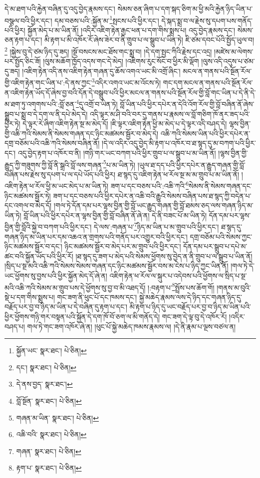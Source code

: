 དེ་མ་ཐག་པའི་རྐྱེན་བཞིན་དུ་འདུ་བྱེད་རྣམས་དང་། སེམས་ཅན་ཞིག་པ་དག་སྐད་ཅིག་མ་ཕྱི་མའི་རྐྱེན་ཉིད་ཡིན་པ་བསྩལ་བའི་ཕྱིར་དང་། དམ་བཅས་པའི་:སྐྱོན་མ་\footnote{སྐྱོན་ཡང་  སྣར་ཐང་།  པེ་ཅིན། }སྤངས་པའི་ཕྱིར་དང་། དེ་སྐད་སྨྲ་བ་ལ་རྗེས་སུ་དཔག་པས་གནོད་པའི་ཕྱིར། སྐྱོན་མེད་པ་མ་ཡིན་ནོ། །འདིར་འཇིག་རྟེན་རྒྱང་ཕན་པ་དག་གིས་སྨྲས་པ། འདུ་བྱེད་རྣམས་དང་། སེམས་ཅན་རྟག་པ་དང་། མི་རྟག་པ་མི་འཁོར་རོ་ཞེས་ཟེར་བ་ནི་གྲུབ་པ་ལ་སྒྲུབ་པ་ཡིན་ཏེ། ཇི་ཙམ་དབང་པོའི་སྤྱོད་ཡུལ་བ།\footnote{དང་།  སྣར་ཐང་།  པེ་ཅིན། } །སྐྱེས་བུ་དེ་ཙམ་ཉིད་དུ་ཟད། །སྔོ་བསངས་མང་ཐོས་གང་སྨྲ་བ། །དེ་དག་སྤྱང་ཀིའི་རྗེས་དང་འདྲ། །མཛེས་མ་ལེགས་པར་སྤྱོད་ཅིང་ཟོ། །ལུས་མཆོག་ཁྱོད་འདས་གང་དེ་མེད། །འཇིགས་རུང་སོང་བ་ཕྱིར་མི་ལྡོག །ལུས་འདི་འདུས་པ་ཙམ་དུ་ཟད། །འཇིག་རྟེན་འདི་ནས་འཇིག་རྟེན་གཞན་དུ་ཆོས་འགའ་ཡང་མི་འགྲོ་ཞིང་། མངལ་ན་གནས་པའི་སྔོན་རོལ་གྱི་འཇིག་རྟེན་གང་ཡིན་པ་:དེ་ནས་ཀྱང་\footnote{དེ་ནས་བྱད་  སྣར་ཐང་། }འདིར་འགའ་ཡང་མ་འོངས་ཏེ། གང་དག་མངལ་ན་གནས་པའི་སྔོན་རོལ་ན་འཇིག་རྟེན་ཡོད་དོ་ཞེས་བྱ་བའི་དོན་དེ་བསྒྲུབ་པའི་ཕྱིར་མངལ་ན་གནས་པའི་སྔོན་རོལ་གྱི་བློ་གང་ཡིན་པ་དེ་ནི་དེ་མ་ཐག་ཏུ་འགགས་པའི་:བློ་ཅན་\footnote{བློ་སྔོན་  སྣར་ཐང་།  པེ་ཅིན། }དུ་འགྲོ་བ་ཡིན་ཏེ། བློ་ཡིན་པའི་ཕྱིར་དཔེར་ན་དེའི་འོག་རོལ་གྱི་བློ་བཞིན་ནོ་ཞེས་སྒྲུབ་པ་སྨྲ་བ་དེ་དག་ལ་ནི་དཔེ་མེད་དེ། འདི་ལྟར་མ་ཤི་བའི་བར་དུ་གནས་པ་རྣམས་ལ་བློ་གཅིག་ཁོ་ནར་ཟད་པའི་ཕྱིར་ཏེ། དེ་ལྟར་རེ་ཞིག་འཇིག་རྟེན་སྔ་མ་མེད་དོ། །ཇི་ལྟར་འཇིག་རྟེན་ཕྱི་མ་མེད་པ་དེ་ལྟར་འདི་བཤད་དེ། ལྷས་བྱིན་གྱི་འཆི་ཀའི་སེམས་ནི་སེམས་གཞན་དང་ཉིང་མཚམས་སྦྱོར་བ་མེད་དེ། འཆི་ཀའི་སེམས་ཡིན་པའི་ཕྱིར་དཔེར་ན་དགྲ་བཅོམ་པའི་འཆི་ཀའི་སེམས་བཞིན་ནོ། །དེ་ལ་འདིར་འདུ་བྱེད་མི་རྟག་པ་འཁོར་བ་ཐ་སྙད་དུ་མ་བཀག་པའི་ཕྱིར་དང་། འདུ་བྱེད་རྟག་པ་འཁོར་བ་ནི། །གཉི་གར་ཡང་བཀག་པའི་ཕྱིར་གྲུབ་པ་ལ་སྒྲུབ་པ་མ་ཡིན་ནོ། །ལྷས་བྱིན་གྱི་རྒྱུད་ཀྱི་གཟུགས་ཀྱི་བློ་ནི་སྒྲའི་བློ་ལས་གཞན་\footnote{གཞན་མ་ཡིན་  སྣར་ཐང་།  པེ་ཅིན། }པ་མ་ཡིན་ཏེ། །ཡུལ་ཐ་དད་པའི་ཕྱིར་དཔེར་ན་རྒྱུད་གཞན་གྱི་བློ་བཞིན་པས་རྗེས་སུ་དཔག་པ་ལ་དཔེ་ཡོད་པའི་ཕྱིར། ཐ་སྙད་དུ་འཇིག་རྟེན་ཕ་རོལ་སྔ་མ་མ་གྲུབ་པ་མ་ཡིན་ནོ། །འཇིག་རྟེན་ཕ་རོལ་ཕྱི་མ་ཡང་མེད་པ་མ་ཡིན་ཏེ། ཟག་པ་དང་བཅས་པའི་:འཆི་ཀའི་\footnote{འཆི་བའི་  སྣར་ཐང་།  པེ་ཅིན། }སེམས་ནི་སེམས་གཞན་དང་ཉིང་མཚམས་སྦྱོར་ཏེ། ཟག་པ་དང་བཅས་པའི་ཕྱིར་དཔེར་ན་འཆི་བའི་རྒྱུའི་སེམས་བཞིན་པས་ཐ་སྙད་ཀྱི་བདེན་པ་དང་འགལ་བ་མེད་དོ། །གལ་ཏེ་དོན་དམ་པར་ལྷས་བྱིན་གྱི་བློ་ཡང་རྒྱུད་གཞན་གྱི་བློ་ཐམས་ཅད་ལས་གཞན་ཉིད་མ་ཡིན་ཏེ། བློ་ཡིན་པའི་ཕྱིར་དཔེར་ན་ལྷས་བྱིན་གྱི་བློ་བཞིན་ནོ་ཞེ་ན། དེ་ནི་བཟང་པོ་མ་ཡིན་ཏེ། དོན་དམ་པར་ལྷས་བྱིན་གྱི་བློའི་སྐྱེ་བ་བཀག་པའི་ཕྱིར་དང་། དེ་ལས་:གཞན་པ་\footnote{གཞན་  སྣར་ཐང་།  པེ་ཅིན། }ཉིད་མ་ཡིན་པ་མ་གྲུབ་པའི་ཕྱིར་དང་། ཐ་སྙད་དུ་གཞན་ཉིད་མ་ཡིན་པར་དམ་འཆའ་ན་གྲགས་པའི་གནོད་པར་འགྱུར་བའི་ཕྱིར་དང་། དགྲ་བཅོམ་པའི་སེམས་ཀྱང་ཉིང་མཚམས་སྦྱོར་བ་དང་། ཉིང་མཚམས་སྦྱོར་བ་མེད་པར་མ་གྲུབ་པའི་ཕྱིར་དང་། དོན་དམ་པར་སྒྲུབ་པ་དཔེ་མ་ཚང་བའི་སྐྱོན་ཡོད་པའི་ཕྱིར་རོ། །ཐ་སྙད་དུ་ཟག་པ་མེད་པའི་སེམས་ཕྱོགས་སུ་བྱེད་ན་ནི་གྲུབ་པ་ལ་སྒྲུབ་པ་ཡིན་ནོ། །སྲིད་པ་སྔ་མའི་འཆི་ཀའི་སེམས་སེམས་གཞན་དང་ཉིང་མཚམས་སྦྱོར་བས་མ་ངེས་པ་ཉིད་ཀྱང་ཡིན་ནོ། །གལ་ཏེ་དེ་ཡང་ཕྱོགས་སུ་བྱས་པའི་ཕྱིར་སྐྱོན་མེད་དོ་ཞེ་ན། འཇིག་རྟེན་ཕ་རོལ་ལ་སྐུར་པ་འདེབས་པའི་ཕྱོགས་ལ་སྲིད་པ་སྔ་མའི་འཆི་ཀའི་སེམས་མ་གྲུབ་པས་དེ་ཕྱོགས་སུ་བྱ་བ་མི་འཐད་དོ། །:བརྟག་པ་\footnote{རྟག་པ་  སྣར་ཐང་།  པེ་ཅིན། }སྤྲོས་པས་ཆོག་གོ། །གནས་མ་བུའི་སྡེ་པ་དག་གིས་སྨྲས་པ། གང་ཟག་ནི་ཕུང་པོ་དང་ཁམས་དང་། སྐྱེ་མཆེད་རྣམས་ལས་དེ་ཉིད་དང་གཞན་ཉིད་དུ་བརྗོད་པར་བྱ་བ་ཉིད་མ་ཡིན་པ་དེ་བཞིན་དུ་རྟག་པ་དང་། མི་རྟག་པ་ཉིད་དུ་ཡང་བརྗོད་པར་བྱ་བ་ཉིད་མ་ཡིན་པའི་ཕྱིར་ཕྱོགས་གཉི་གར་བསྟན་པའི་སྐྱོན་དེ་དག་ཁོ་བོ་ཅག་ལ་མི་གནོད་དེ། གང་ཟག་དེ་ལྟ་བུ་དེ་འཁོར་རོ། །འདིར་བཤད་པ། གལ་ཏེ་གང་ཟག་འཁོར་ཞེ་ན། །ཕུང་པོ་སྐྱེ་མཆེད་ཁམས་རྣམས་ལ། །དེ་ནི་རྣམ་པ་ལྔས་བཙལ་ན། 